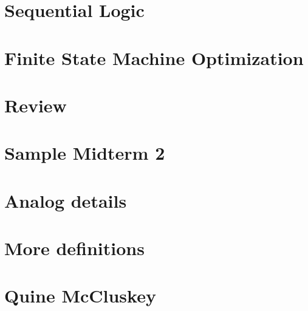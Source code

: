 \documentclass[oneside]{book}
\begin{document}
\chapter{Sequential Logic}

%
%
%
\chapter{Finite State Machine Optimization}

\chapter*{Review}

\chapter{Sample Midterm 2}

\chapter{Analog details}

\chapter{More definitions}

\chapter{Quine McCluskey}




\end{document}
